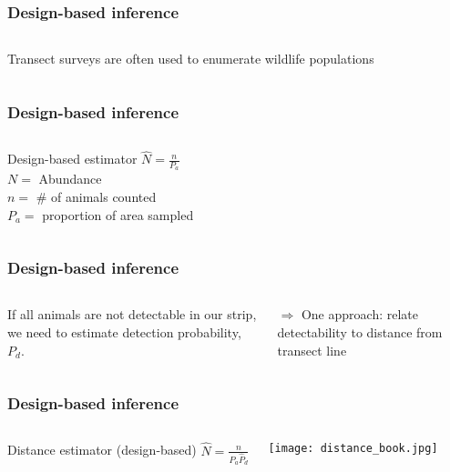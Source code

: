 \documentclass[serif,mathserif]{beamer}
\begin{document}
\begin{frame}
\frametitle{Design-based inference}
\begin{columns}[c]
\column{1.5in}
Transect surveys are often used to enumerate wildlife populations
\column{2in}
\end{columns}
\end{frame}

\begin{frame}
  \frametitle{Design-based inference}
\begin{columns}[c]
\column{1.5in}
  \begin{block}{Design-based estimator}
  \huge $\hat{N}=\frac{n}{P_a}$ \large \\
  \vspace{1cm}
  $N=$ Abundance \\
  $n=$ \# of animals counted \\
  $P_a=$ proportion of area sampled
  \end{block}
\column{2in}
\end{columns}
\end{frame}

\begin{frame}
  \frametitle{Design-based inference}
\begin{columns}[c]
\column{1.5in}
If all animals are not detectable in our strip, we need to estimate detection probability, $P_d$. \vspace{.5cm}

{\color{noaaturq}$\Rightarrow$ One approach: relate detectability to distance from transect line}
\column{2in}
\end{columns}
\end{frame}

\begin{frame}
  \frametitle{Design-based inference}
\begin{columns}[c]
\column{1.5in}
 \begin{block}{Distance estimator (design-based)}
  \huge $\hat{N}=\frac{n}{P_a \hat{P}_d}$ \large \\
  \end{block}
  \vspace{.5 cm}
  \begin{center}
  \texttt{[image: distance\_book.jpg]}
  \end{center}
\column{2in}
\end{columns}
\end{frame}
\end{document}
